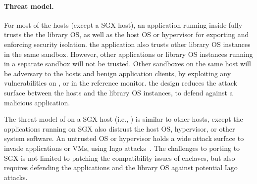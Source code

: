 \paragraph{Threat model.}
For most of the \graphene{} hosts (except a SGX host),
an application running inside \graphene{} fully trusts the the library OS,
as well as the host OS or hypervisor
for exporting \thehostabi{} and enforcing security isolation.
the application also trusts other library OS instances in the same sandbox.
However, other applications or library OS instances running in a separate sandbox
will not be trusted.
Other sandboxes on the same host
will be adversary to the hosts and benign application clients,
by exploiting any vulnerabilities on \thehostabi{}, or in the reference monitor.
the \graphene{} design reduces the attack surface between the hosts and the library OS instances, to defend against a malicious application.




The threat model of \graphene{} on a SGX host (i.e., \graphenesgx{}) is similar to other hosts, except the applications running on SGX also distrust the host OS, hypervisor, or other system software.
An untrusted OS or hypervisor
holds a wide attack surface to invade applications or VMs,
using Iago attacks~\cite{checkoway13iago}.
The challenges to porting \graphene{} to SGX is not limited to patching the compatibility issues of enclaves, but also requires defending the applications and the library OS against potential Iago attacks.







